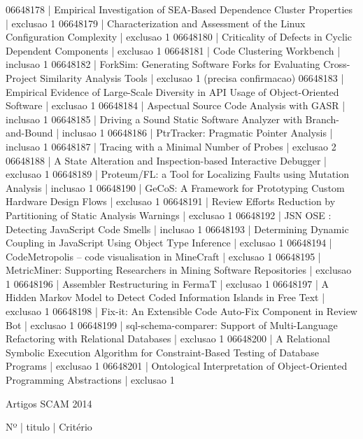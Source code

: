 \documentclass[12pt]{article}
\begin{document}
06648178 | Empirical Investigation of SEA-Based Dependence Cluster Properties | exclusao 1
06648179 | Characterization and Assessment of the Linux Configuration Complexity | exclusao 1
06648180 | Criticality of Defects in Cyclic Dependent Components | exclusao 1
06648181 | Code Clustering Workbench | inclusao 1
06648182 | ForkSim: Generating Software Forks for Evaluating Cross-Project Similarity Analysis Tools | exclusao 1 (precisa confirmacao)
06648183 | Empirical Evidence of Large-Scale Diversity in API Usage of Object-Oriented Software | exclusao 1
06648184 | Aspectual Source Code Analysis with GASR | inclusao 1
06648185 | Driving a Sound Static Software Analyzer with Branch-and-Bound | inclusao 1
06648186 | PtrTracker: Pragmatic Pointer Analysis | inclusao 1
06648187 | Tracing with a Minimal Number of Probes | exclusao 2
06648188 | A State Alteration and Inspection-based Interactive Debugger | exclusao 1
06648189 | Proteum/FL: a Tool for Localizing Faults using Mutation Analysis | inclusao 1
06648190 | GeCoS: A Framework for Prototyping Custom Hardware Design Flows | exclusao 1
06648191 | Review Efforts Reduction by Partitioning of Static Analysis Warnings | exclusao 1
06648192 | JSN OSE : Detecting JavaScript Code Smells | inclusao 1
06648193 | Determining Dynamic Coupling in JavaScript Using Object Type Inference | exclusao 1
06648194 | CodeMetropolis – code visualisation in MineCraft | exclusao 1
06648195 | MetricMiner: Supporting Researchers in Mining Software Repositories | exclusao 1
06648196 | Assembler Restructuring in FermaT | exclusao 1
06648197 | A Hidden Markov Model to Detect Coded Information Islands in Free Text | exclusao 1
06648198 | Fix-it: An Extensible Code Auto-Fix Component in Review Bot | exclusao 1
06648199 | sql-schema-comparer: Support of Multi-Language Refactoring with Relational Databases | exclusao 1
06648200 | A Relational Symbolic Execution Algorithm for Constraint-Based Testing of Database Programs | exclusao 1
06648201 | Ontological Interpretation of Object-Oriented Programming Abstractions | exclusao 1


Artigos SCAM 2014

Nº | titulo | Critério
\end{document}
